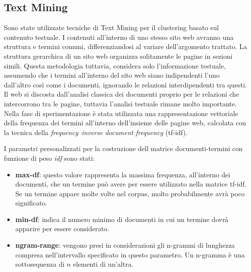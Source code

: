 \subsection{Text Mining}
Sono state utilizzate tecniche di Text Mining per il clustering basato sul contenuto testuale. I contenuti all'interno di uno stesso sito web avranno una struttura e termini comuni, differenziandosi al variare dell'argomento trattato. La struttura gerarchica di un sito web organizza solitamente le pagine in sezioni simili. Questa metodologia tuttavia, considera solo l'informazione testuale, assumendo che i termini all'interno del sito web siano indipendenti l'uno dall'altro così come i documenti, ignorando le relazioni interdipendenti tra questi. Il web si discosta dall'analisi classica dei documenti proprio per le relazioni che intercorrono tra le pagine, tuttavia l'analisi testuale rimane molto importante.
\\
Nella fase di sperimentazione è stata utilizzata una rappresentazione vettoriale della frequenza dei termini all'interno dell'insieme delle pagine web, calcolata con la tecnica della \textit{frequency–inverse document frequency} (tf-idf).

I parametri personalizzati per la costruzione dell matrice documenti-termini con funzione di peso \textit{idf} sono stati:
\begin{itemize}
\item \textbf{max-df}: questo valore rappresenta la massima frequenza, all'interno dei documenti, che un termine può avere per essere utilizzato nella matrice tf-idf. Se un termine appare molte volte nel corpus, molto probabilmente avrà poco significato.
\item \textbf{min-df}: indica il numero minimo di documenti in cui un termine dovrà apparire per essere considerato.
\item \textbf{ngram-range}: vengono presi in considerazioni gli n-grammi di lunghezza compresa nell'intervallo specificato in questo parametro. Un n-gramma è una sottosequenza  di $n$ elementi di un'altra.
\end{itemize}


